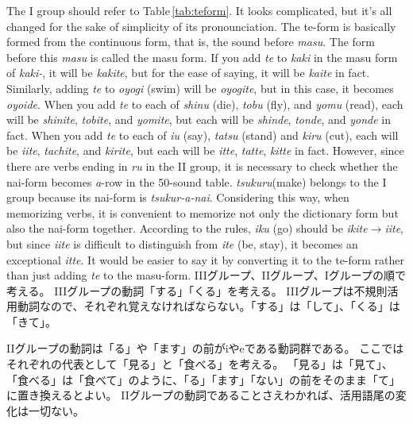 \documentclass[uplatex,dvipdfmx,b5paper,english,10pt]{jsbook}
\begin{document}
\begin{description}
The I group should refer to Table\,\ref{tab:teform}.
It looks complicated, but it's all changed for the sake of simplicity of its pronounciation.
The te-form is basically formed from the continuous form, that is, the sound before {\it masu\/}.
The form before this {\it masu\/} is called the masu form.
If you add {\it te\/} to {\it kaki\/} in the masu form of {\it kaki-\/}, it will be {\it kakite\/}, but for the ease of saying, it will be {\it kaite\/} in fact.
Similarly, adding {\it te\/} to {\it oyogi} (swim) will be {\it oyogite\/}, but in this case, it becomes {\it oyoide\/}.
When you add {\it te\/} to each of {\it shinu\/} (die), {\it tobu\/} (fly), and {\it yomu\/} (read),  each will be {\it shinite\/}, {\it tobite\/}, and {\it yomite\/}, but each will be {\it shinde\/}, {\it tonde\/}, and {\it yonde\/} in fact.
When you add {\it te\/}  to each of {\it iu\/} (say), {\it tatsu\/} (stand) and {\it kiru\/} (cut), each will be {\it iite\/}, {\it tachite\/}, and {\it kirite\/}, but each will be {\it itte\/}, {\it tatte\/}, {\it kitte\/} in fact.
However, since there are verbs ending in {\it ru\/} in the II group, it is necessary to check whether the nai-form becomes {\it a\/}-row in the 50-sound table.
{\it tsukuru\/}(make) belongs to the I group because its nai-form is {\it tsukur-a-nai\/}.
Considering this way, when memorizing verbs, it is convenient to memorize not only the dictionary form but also the nai-form together.
According to the rules, {\it iku\/} (go) should be {\it ikite\/}$\rightarrow${\it iite\/}, but since {\it iite\/} is difficult to distinguish from {\it ite\/} (be, stay), it becomes an exceptional {\it itte\/}.
It would be easier to say it by converting it to the te-form rather than just adding {\it te\/} to the masu-form.
\else
IIIグループ、IIグループ、Iグループの順で考える。
IIIグループの動詞「する」「くる」を考える。
IIIグループは不規則活用動詞なので、それぞれ覚えなければならない。「する」は「して」、「くる」は「きて」。

IIグループの動詞は「る」や「ます」の前がiやeである動詞群である。
ここではそれぞれの代表として「見る」と「食べる」を考える。
「見る」は「見て」、「食べる」は「食べて」のように、「る」「ます」「ない」の前をそのまま「て」に置き換えるとよい。
IIグループの動詞であることさえわかれば、活用語尾の変化は一切ない。


\end{description}
\end{document}
